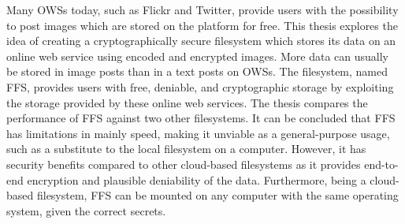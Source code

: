 




Many \gls{OWS}s today, such as Flickr and Twitter, provide users with the possibility to post images which are stored on the platform for free. This thesis explores the idea of creating a cryptographically secure filesystem which stores its data on an online web service using encoded and encrypted images. More data can usually be stored in image posts than in a text posts on \gls{OWS}s. The filesystem, named \gls{FFS}, provides users with free, deniable, and cryptographic storage by exploiting the storage provided by these online web services. The thesis compares the performance of \gls{FFS} against two other filesystems. It can be concluded that \gls{FFS} has limitations in mainly speed, making it unviable as a \mbox{general-purpose} usage, such as a substitute to the local filesystem on a computer. However, it has security benefits compared to other \mbox{cloud-based} filesystems as it provides end-to-end encryption and plausible deniability of the data. Furthermore, being a \mbox{cloud-based} filesystem, \gls{FFS} can be mounted on any computer with the same operating system, given the correct secrets. 

